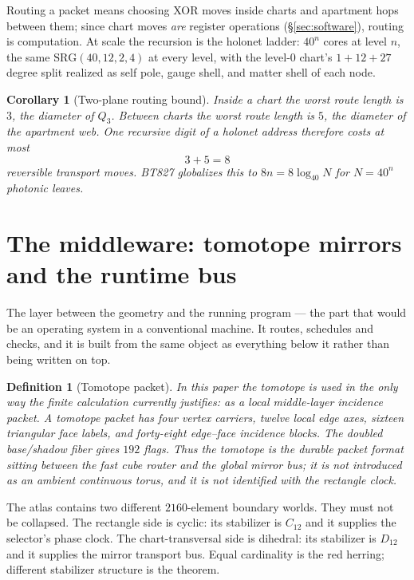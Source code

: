 \documentclass[11pt]{article}
\newtheorem{definition}[theorem]{Definition}
\newtheorem{corollary}[theorem]{Corollary}
\begin{document}
Routing a packet means choosing XOR moves inside charts and apartment
hops between them; since chart moves \emph{are} register operations
(\S\ref{sec:software}), routing is computation.  At scale the
recursion is the holonet ladder: $40^n$ cores at level $n$, the same
$\mathrm{SRG}(40,12,2,4)$ at every level, with the level-$0$ chart's
$1+12+27$ degree split realized as self pole, gauge shell, and matter
shell of each node.

\begin{corollary}[Two-plane routing bound]
Inside a chart the worst route length is $3$, the diameter of $Q_3$.
Between charts the worst route length is $5$, the diameter of the
apartment web.  One recursive digit of a holonet address therefore
costs at most
\[
3+5=8
\]
reversible transport moves.  BT827 globalizes this to
$8n=8\log_{40}N$ for $N=40^n$ photonic leaves.
\end{corollary}

\section{The middleware: tomotope mirrors and the runtime bus}

\begin{plainbox}
The layer between the geometry and the running program --- the part that would be
an operating system in a conventional machine. It routes, schedules and checks, and it is
built from the same object as everything below it rather than being written on top.
\end{plainbox}

\label{sec:middleware}

\begin{definition}[Tomotope packet]
In this paper the tomotope is used in the only way the finite
calculation currently justifies: as a local middle-layer incidence
packet.  A tomotope packet has four vertex carriers, twelve local edge
axes, sixteen triangular face labels, and forty-eight edge--face
incidence blocks.  The doubled base/shadow fiber gives $192$ flags.
Thus the tomotope is the durable packet format sitting between the
fast cube router and the global mirror bus; it is not introduced as an
ambient continuous torus, and it is not identified with the rectangle
clock.
\end{definition}

The atlas contains two different $2160$-element boundary worlds.  They
must not be collapsed.  The rectangle side is cyclic: its stabilizer is
$C_{12}$ and it supplies the selector's phase clock.  The
chart-transversal side is dihedral: its stabilizer is $D_{12}$ and it
supplies the mirror transport bus.  Equal cardinality is the red
herring; different stabilizer structure is the theorem.
\end{document}

